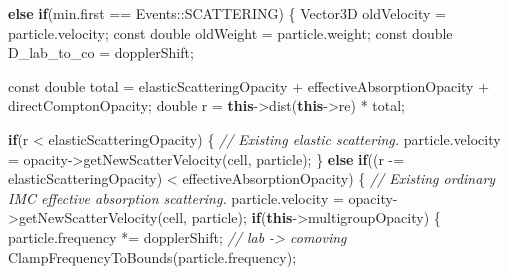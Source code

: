 \documentclass[
]{article}
\newenvironment{Shaded}{}{}
\newcommand{\AttributeTok}[1]{\textcolor[rgb]{0.49,0.56,0.16}{#1}}
\newcommand{\CommentTok}[1]{\textcolor[rgb]{0.38,0.63,0.69}{\textit{#1}}}
\newcommand{\ControlFlowTok}[1]{\textcolor[rgb]{0.00,0.44,0.13}{\textbf{#1}}}
\newcommand{\DataTypeTok}[1]{\textcolor[rgb]{0.56,0.13,0.00}{#1}}
\newcommand{\KeywordTok}[1]{\textcolor[rgb]{0.00,0.44,0.13}{\textbf{#1}}}
\newcommand{\NormalTok}[1]{#1}
\newcommand{\OperatorTok}[1]{\textcolor[rgb]{0.40,0.40,0.40}{#1}}
\begin{document}
\begin{Shaded}
\begin{Highlighting}[]
\ControlFlowTok{else} \ControlFlowTok{if}\OperatorTok{(}\NormalTok{min}\OperatorTok{.}\NormalTok{first }\OperatorTok{==}\NormalTok{ Events}\OperatorTok{::}\NormalTok{SCATTERING}\OperatorTok{)}
\OperatorTok{\{}
\NormalTok{    Vector3D oldVelocity }\OperatorTok{=}\NormalTok{ particle}\OperatorTok{.}\NormalTok{velocity}\OperatorTok{;}
    \AttributeTok{const} \DataTypeTok{double}\NormalTok{ oldWeight }\OperatorTok{=}\NormalTok{ particle}\OperatorTok{.}\NormalTok{weight}\OperatorTok{;}
    \AttributeTok{const} \DataTypeTok{double}\NormalTok{ D\_lab\_to\_co }\OperatorTok{=}\NormalTok{ dopplerShift}\OperatorTok{;}

    \AttributeTok{const} \DataTypeTok{double}\NormalTok{ total }\OperatorTok{=}\NormalTok{ elasticScatteringOpacity }\OperatorTok{+}\NormalTok{ effectiveAbsorptionOpacity }\OperatorTok{+}\NormalTok{ directComptonOpacity}\OperatorTok{;}
    \DataTypeTok{double}\NormalTok{ r }\OperatorTok{=} \KeywordTok{this}\OperatorTok{{-}\textgreater{}}\NormalTok{dist}\OperatorTok{(}\KeywordTok{this}\OperatorTok{{-}\textgreater{}}\NormalTok{re}\OperatorTok{)} \OperatorTok{*}\NormalTok{ total}\OperatorTok{;}

    \ControlFlowTok{if}\OperatorTok{(}\NormalTok{r }\OperatorTok{\textless{}}\NormalTok{ elasticScatteringOpacity}\OperatorTok{)}
    \OperatorTok{\{}
        \CommentTok{// Existing elastic scattering.}
\NormalTok{        particle}\OperatorTok{.}\NormalTok{velocity }\OperatorTok{=}\NormalTok{ opacity}\OperatorTok{{-}\textgreater{}}\NormalTok{getNewScatterVelocity}\OperatorTok{(}\NormalTok{cell}\OperatorTok{,}\NormalTok{ particle}\OperatorTok{);}
    \OperatorTok{\}}
    \ControlFlowTok{else} \ControlFlowTok{if}\OperatorTok{((}\NormalTok{r }\OperatorTok{{-}=}\NormalTok{ elasticScatteringOpacity}\OperatorTok{)} \OperatorTok{\textless{}}\NormalTok{ effectiveAbsorptionOpacity}\OperatorTok{)}
    \OperatorTok{\{}
        \CommentTok{// Existing ordinary IMC effective absorption scattering.}
\NormalTok{        particle}\OperatorTok{.}\NormalTok{velocity }\OperatorTok{=}\NormalTok{ opacity}\OperatorTok{{-}\textgreater{}}\NormalTok{getNewScatterVelocity}\OperatorTok{(}\NormalTok{cell}\OperatorTok{,}\NormalTok{ particle}\OperatorTok{);}
        \ControlFlowTok{if}\OperatorTok{(}\KeywordTok{this}\OperatorTok{{-}\textgreater{}}\NormalTok{multigroupOpacity}\OperatorTok{)}
        \OperatorTok{\{}
\NormalTok{            particle}\OperatorTok{.}\NormalTok{frequency }\OperatorTok{*=}\NormalTok{ dopplerShift}\OperatorTok{;} \CommentTok{// lab {-}\textgreater{} comoving}
\NormalTok{            ClampFrequencyToBounds}\OperatorTok{(}\NormalTok{particle}\OperatorTok{.}\NormalTok{frequency}\OperatorTok{);}


\end{Highlighting}
\end{Shaded}
\end{document}
